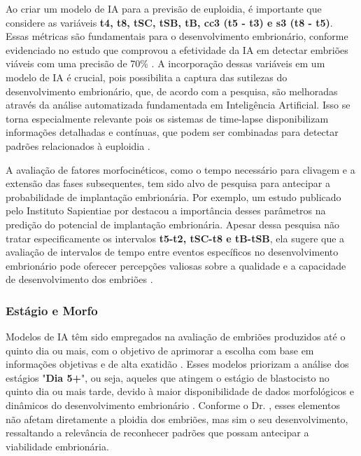 Ao criar um modelo de IA para a previsão de euploidia, é importante que considere as variáveis \textbf{t4, t8, tSC, tSB, tB, cc3 (t5 - t3) e s3 (t8 - t5)}. Essas métricas são fundamentais para o desenvolvimento embrionário, conforme evidenciado no estudo que comprovou a efetividade da IA em detectar embriões viáveis com uma precisão de 70\% \cite{borges2019}. A incorporação dessas variáveis em um modelo de IA é crucial, pois possibilita a captura das sutilezas do desenvolvimento embrionário, que, de acordo com a pesquisa, são melhoradas através da análise automatizada fundamentada em Inteligência Artificial. Isso se torna especialmente relevante pois os sistemas de time-lapse disponibilizam informações detalhadas e contínuas, que podem ser combinadas para detectar padrões relacionados à euploidia \cite{borges2019}.

A avaliação de fatores morfocinéticos, como o tempo necessário para clivagem e a extensão das fases subsequentes, tem sido alvo de pesquisa para antecipar a probabilidade de implantação embrionária. Por exemplo, um estudo publicado pelo Instituto Sapientiae por  destacou a importância desses parâmetros na predição do potencial de implantação embrionária. Apesar dessa pesquisa não tratar especificamente os intervalos \textbf{t5-t2, tSC-t8 e tB-tSB}, ela sugere que a avaliação de intervalos de tempo entre eventos específicos no desenvolvimento embrionário pode oferecer percepções valiosas sobre a qualidade e a capacidade de desenvolvimento dos embriões \cite{borges2022}.

\subsubsection{Estágio e Morfo}
Modelos de IA têm sido empregados na avaliação de embriões produzidos até o quinto dia ou mais, com o objetivo de aprimorar a escolha com base em informações objetivas e de alta exatidão \cite{lassen2022}. Esses modelos priorizam a análise dos estágios "\textbf{Dia 5+}", ou seja, aqueles que atingem o estágio de blastocisto no quinto dia ou mais tarde, devido à maior disponibilidade de dados morfológicos e dinâmicos do desenvolvimento embrionário \cite{lassen2022}. Conforme o Dr. , esses elementos não afetam diretamente a ploidia dos embriões, mas sim o seu desenvolvimento, ressaltando a relevância de reconhecer padrões que possam antecipar a viabilidade embrionária.

